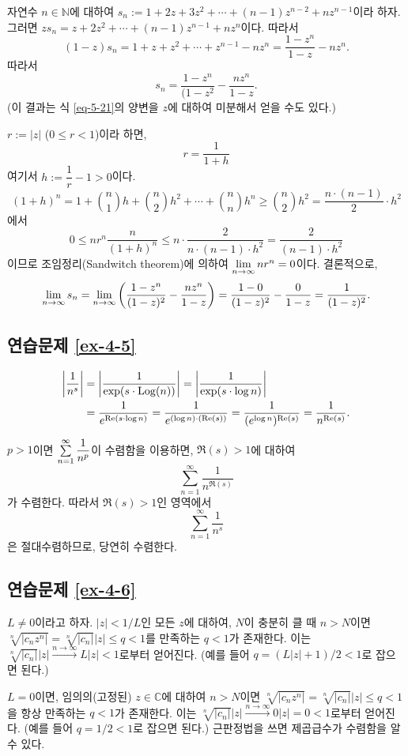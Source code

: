 자연수 $n\in\mathbb N$에 대하여 
$s_n:= 1+2z + 3z^2 + \cdots + (n-1)z^{n-2} + nz^{n-1}$이라 하자.
그러면 $zs_n = z + 2z^2 + \cdots + (n-1)z^{n-1} + nz^n$이다.
따라서
\[
(1-z)s_n= 1 + z + z^2 + \cdots + z^{n-1} - nz^n
= \dfrac{1-z^n}{1-z}  - nz^n.
\]
따라서
\[
s_n = \dfrac{1-z^n}{(1-z^2}  - \dfrac{nz^n}{1-z}.
\]
(이 결과는 식 \eqref{eq-5-21}의 양변을 $z$에 대하여 미분해서 얻을 수도 있다.)

$r:=|z|$ ($0\le r < 1$)이라 하면,
\[
r = \dfrac1{1+h}
\]
여기서 $h:=\dfrac1r-1>0$이다.
\[
(1+h)^n = 1 + {n\choose 1}h + {n \choose 2}h^2 + \cdots
+ {n \choose n}h^n \ge {n \choose 2}h^2 = \dfrac{n\cdot(n-1)}2 \cdot h^2
\]
에서
\[
0\le nr^n \dfrac n{(1+h)^n} \le n \cdot \dfrac2{n\cdot(n-1)\cdot h^2}
= \dfrac 2{(n-1)\cdot h^2}
\]
이므로
조임정리(Sandwitch theorem)에 의하여 $\lim\limits_{n\to\infty} nr^n = 0$이다.
결론적으로,
\[
\lim\limits_{n\to\infty}  s_n = \lim\limits_{n\to\infty} \left( \displaystyle\frac{1-z^n}{(1-z)^2}
- \displaystyle\frac{nz^n}{1-z} \right)
= \displaystyle\frac{1-0}{(1-z)^2} - \displaystyle\frac0{1-z} = \displaystyle\frac1{(1-z)^2}.
\]

\subsection*{연습문제 \ref{ex-4-5}}

\begin{align*}
\left| \displaystyle\frac1{n^s} \right| &= \left| \displaystyle\frac1{\exp(s\cdot \mathop{\mathrm{Log}}(n))} \right|
= \left| \displaystyle\frac1{\exp(s\cdot\log n)}\right| \\
&= \displaystyle\frac1{e^{\Re(s\cdot \log n)}} = \displaystyle\frac1{e^{(\log n)\cdot(\Re(s))}}
= \displaystyle\frac1{(e^{\log n})^{\Re(s)}} = \displaystyle\frac1{n^{\Re(s)}}.
\end{align*}

$p>1$이면 $\sum\limits_{n=1}^\infty \displaystyle\frac1{n^p}$이 수렴함을 이용하면,
$\Re(s)>1$에 대하여
\[
\sum_{n=1}^\infty \dfrac1{n^{\Re(s)}}
\]
가 수렴한다. 따라서  $\Re(s)>1$인 영역에서
\[
\sum_{n=1}^\infty \dfrac1{n^{s}}
\]
은 절대수렴하므로, 당연히 수렴한다.

\subsection*{연습문제 \ref{ex-4-6}}

$L\ne0$이라고 하자.
$|z|< 1/L$인 모든 $z$에 대하여, 
$N$이 충분히 클 때 $n>N$이면
$\sqrt[n]{|c_nz^n|}  = \sqrt[n]{|c_n|}|z| \le q <1$를 만족하는 $q<1$가 존재한다.
이는 $\sqrt[n]{|c_n|}|z| \stackrel{n\to\infty}{\longrightarrow}L|z|<1$로부터 얻어진다.
(예를 들어 $q=(L|z|+1)/2 <1$로 잡으면 된다.)

$L=0$이면, 
임의의(고정된) $z\in \mathbb C$에 대하여
$n>N$이면 $\sqrt[n]{|c_nz^n|} = \sqrt[n]{|c_n|}|z| \le q < 1$을 항상 만족하는 $q<1$가 존재한다.
이는 $\sqrt[n]{|c_n|}|z| \stackrel{n\to\infty}{\longrightarrow}0|z|=0<1$로부터 얻어진다.
(예를 들어 $q=1/2<1$로 잡으면 된다.)
근판정법을 쓰면 제곱급수가 수렴함을 알 수 있다.


